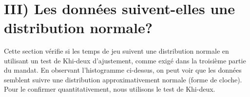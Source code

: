     \begin{center}
    \end{center}
    { \hspace*{\fill} \\}

    \section{III) Les données suivent-elles une distribution
normale?}\label{iii-les-donnuxe9es-suivent-elles-une-distribution-normale}

Cette section vérifie si les temps de jeu suivent une distribution
normale en utilisant un test de Khi-deux d'ajustement, comme exigé dans
la troisième partie du mandat. En observant l'histogramme ci-dessus, on
peut voir que les données semblent suivre une distribution
approximativement normale (forme de cloche). Pour le confirmer
quantitativement, nous utilisons le test de Khi-deux.

